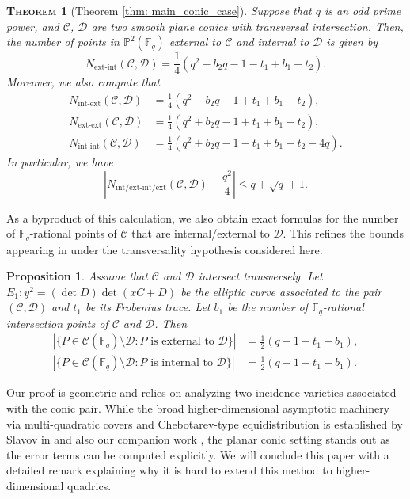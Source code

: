 \documentclass[11pt]{article}
\newtheorem*{thm*}{\textsc{Theorem}}
\newtheorem{prop}[defn]{Proposition}
\theoremstyle{definition}
\theoremstyle{definition}
\begin{document}
\begin{thm*}[Theorem \ref{thm: main_conic_case}]
Suppose that $q$ is an odd prime power, and $\mathcal{C}$, $\mathcal{D}$ are two smooth plane conics with transversal intersection. Then, the number of points in $\mathbb{P}^2(\mathbb{F}_q)$ external to $\mathcal{C}$ and internal to $\mathcal{D}$ is given by
\[
 N_{\mathrm{ext\text{-}int}}(\mathcal{C}, \mathcal{D}) = \frac{1}{4}({q^2 - b_2 q - 1 - t_1 + b_1 + t_2}).
\]
Moreover, we also compute that
\begin{align*}
    N_{\mathrm{int\text{-}ext}}(\mathcal C,\mathcal D) &= \frac{1}{4}(q^2-b_2q-1+t_1+b_1-t_2), \\
    N_{\mathrm{ext\text{-}ext}}(\mathcal C,\mathcal D) &= \frac{1}{4}(q^2+b_2q-1+t_1+b_1+t_2), \\
    N_{\mathrm{int\text{-}int}}(\mathcal C,\mathcal D) &= \frac{1}{4}(q^2+b_2q-1-t_1+b_1-t_2-4q).
\end{align*}
In particular, we have 
$$\left|N_{\mathrm{int/ext\text{-}int/ext}}(\mathcal{C}, \mathcal{D}) - \frac{q^2}{4}\right|\leq q+\sqrt{q}+1.$$
\end{thm*}

As a byproduct of this calculation, we also obtain exact formulas for the number of $\mathbb F_q$-rational points of $\mathcal{C}$ that are internal/external to $\mathcal{D}$. This refines the bounds appearing in \cite[Theorem~1.1]{abatangelo2011mutual} under the transversality hypothesis considered here.

\begin{prop}
Assume that $\mathcal C$ and $\mathcal D$ intersect transversely. Let $E_1: y^2=(\det D)\det(xC+D)$ be the elliptic curve associated to the pair $(\mathcal C,\mathcal D)$ and $t_1$ be its Frobenius trace. Let $b_1$ be the number of $\mathbb{F}_q$-rational intersection points of $\mathcal{C}$ and $\mathcal D$. Then
\begin{align*}
|\{P\in \mathcal C(\mathbb F_q)\setminus \mathcal D : P \text{ is external to } \mathcal D \}|
&= \frac{1}{2}(q+1-t_1-b_1), \\
|\{P\in \mathcal C(\mathbb F_q)\setminus \mathcal D : P \text{ is internal to } \mathcal D \}|
&= \frac{1}{2}(q+1+t_1-b_1).
\end{align*}
\end{prop}

Our proof is geometric and relies on analyzing two incidence varieties associated with the conic pair. While the broad higher-dimensional asymptotic machinery via multi-quadratic covers and Chebotarev-type equidistribution is established by Slavov in \cite{Slavov} and also our companion work \cite{Mypaper}, the planar conic setting stands out as the error terms can be computed explicitly. We will conclude this paper with a detailed remark explaining why it is hard to extend this method to higher-dimensional quadrics.
\end{document}
